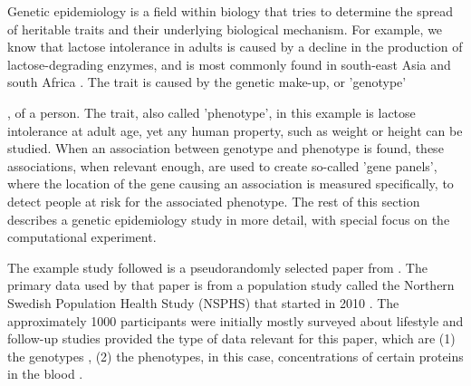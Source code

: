 Genetic epidemiology is a field within biology that
tries to determine the spread of heritable traits 
and their underlying biological mechanism.
For example, we know that lactose intolerance in adults is
caused by a decline in the production of lactose-degrading enzymes,
and is most commonly found in south-east Asia and south Africa \cite{storhaug2017country}.
The trait is caused by the genetic make-up, or 'genotype'

, of a person.
The trait, also called 'phenotype', 
in this example is lactose intolerance at adult age,
yet any human property, such as weight or height can be studied.
When an association between genotype and phenotype is found,
these associations, when relevant enough, are used to 
create so-called 'gene panels', 
where the location of the gene causing 
an association is measured specifically, 
to detect people at risk for the associated phenotype.
The rest of this section describes a genetic epidemiology study 
in more detail, with special focus on the computational experiment.

The example study followed is a pseudorandomly selected paper
from \cite{ahsan2017relative}. The primary data used by that paper is
from a population study called the Northern Swedish Population
Health Study (NSPHS) that started in 2010 \cite{igl2010northern}. 
The approximately 1000 participants were initially mostly surveyed
about lifestyle \cite{igl2010northern} and follow-up studies
provided the type of data relevant for this paper, 
which are (1) the genotypes \cite{johansson2013identification},
(2) the phenotypes, in this case, concentrations of certain proteins in the 
blood \cite{enroth2014strong,enroth2015effect}.

